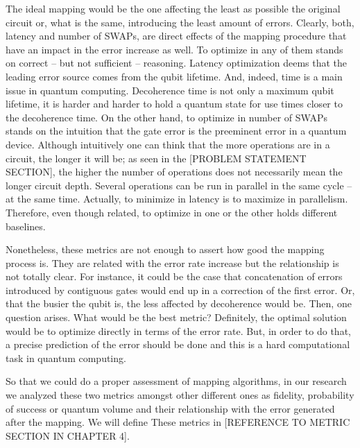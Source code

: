 The ideal mapping would be the one affecting the least as possible the original circuit or, what is the same, introducing the least amount of errors.
Clearly, both, latency and number of SWAPs, are direct effects of the mapping procedure that have an impact in the error increase as well.
To optimize in any of them stands on correct -- but not sufficient -- reasoning.
Latency optimization deems that the leading error source comes from the qubit lifetime.
And, indeed, time is a main issue in quantum computing.
Decoherence time is not only a maximum qubit lifetime, it is harder and harder to hold a quantum state for use times closer to the decoherence time.
On the other hand, to optimize in number of SWAPs stands on the intuition that the gate error is the preeminent error in a quantum device.
Although intuitively one can think that the more operations are in a circuit, the longer it will be; as seen in the [PROBLEM STATEMENT SECTION], the higher the number of operations does not necessarily mean the longer circuit depth.
Several operations can be run in parallel in the same cycle -- at the same time.
Actually, to minimize in latency is to maximize in parallelism.
Therefore, even though related, to optimize in one or the other holds different baselines.

Nonetheless, these metrics are not enough to assert how good the mapping process is.
They are related with the error rate increase but the relationship is not totally clear.
For instance, it could be the case that concatenation of errors introduced by contiguous gates would end up in a correction of the first error.
Or, that the busier the qubit is, the less affected by decoherence would be.
Then, one question arises.
What would be the best metric?
Definitely, the optimal solution would be to optimize directly in terms of the error rate.
But, in order to do that, a precise prediction of the error should be done and this is a hard computational task in quantum computing.

So that we could do a proper assessment of mapping algorithms, in our research we analyzed these two metrics amongst other different ones as fidelity, probability of success or quantum volume and their relationship with the error generated after the mapping.
We will define These metrics in [REFERENCE TO METRIC SECTION IN CHAPTER 4].
